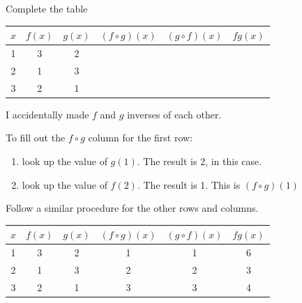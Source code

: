 \documentclass[fleqn,addpoints]{exam}
\begin{document}
\begin{questions}

\question[9]
  Complete the table
\ifprintanswers
\else
  \begin{tabular}{|c||c|c|c|c|c|}
   \hline
   $x$ & $f(x)$ & $g(x)$ & $(f \circ g)(x)$ & $(g \circ f)(x)$ & $fg(x)$  \\
   \hline \hline
    1  &  3     &   2    &                  &                  &  \\
   \hline
    2  &  1     &   3    &                  &                  &  \\
   \hline
    3  &  2     &   1    &                  &                  &  \\
   \hline
  \end{tabular}
\fi
\begin{solution}
I accidentally made $f$ and $g$ inverses of each other.

To fill out the $f \circ g$ column for the first row:
\begin{enumerate}
  \item look up the value of $g(1)$.  The result is 2, in this case.
  \item look up the value of $f(2)$.  The result is 1.  This is $(f \circ g)(1)$
\end{enumerate}

Follow a similar procedure for the other rows and columns.

  \begin{tabular}{|c||c|c|c|c|c|}
   \hline
   $x$ & $f(x)$ & $g(x)$ & $(f \circ g)(x)$ & $(g \circ f)(x)$ & $fg(x)$  \\
   \hline \hline
    1  &  3     &   2    &        1         &      1           &  6 \\
   \hline
    2  &  1     &   3    &      2            &       2           &  3 \\
   \hline
    3  &  2     &   1    &       3           &        3          &  4 \\
   \hline
  \end{tabular}
\end{solution}


\end{questions}
\end{document}
